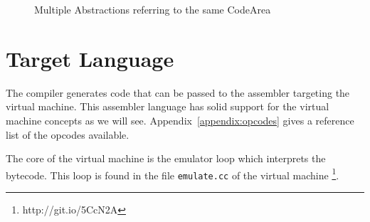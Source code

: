 \documentclass[a4paper]{memoir}
\begin{document}
\begin{figure}[h]
  \centering
{}
\caption{Multiple Abstractions referring to the same CodeArea}
\label{fig:blurps}
\end{figure}


\section{Target Language}
The compiler generates code that can be passed to the assembler targeting the
virtual machine. This assembler language has solid support for the virtual
machine concepts as we will see. Appendix~\ref{appendix:opcodes} gives a reference list of
the opcodes available.

The core of the virtual machine is the emulator loop which interprets the bytecode. This loop is found in the file
\lstinline!emulate.cc! of the virtual
machine \cite{Moz2vmsrc} \footnote{http://git.io/5CcN2A}.
\end{document}
